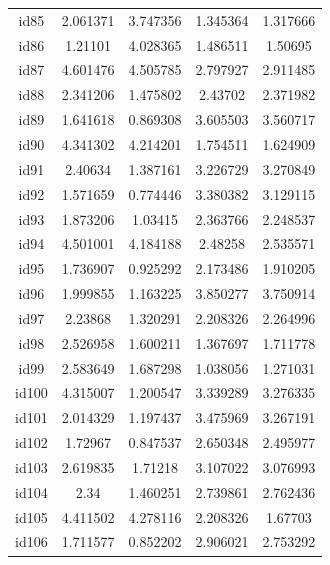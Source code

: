 \documentclass[num-refs]{wiley-article}
\begin{document}
\begin{center}
\begin{longtable}{ccccc}
id85      & 2.061371  & 3.747356       & 1.345364          & 1.317666          \\
id86      & 1.21101   & 4.028365       & 1.486511          & 1.50695           \\
id87      & 4.601476  & 4.505785       & 2.797927          & 2.911485          \\
id88      & 2.341206  & 1.475802       & 2.43702           & 2.371982          \\
id89      & 1.641618  & 0.869308       & 3.605503          & 3.560717          \\
id90      & 4.341302  & 4.214201       & 1.754511          & 1.624909          \\
id91      & 2.40634   & 1.387161       & 3.226729          & 3.270849          \\
id92      & 1.571659  & 0.774446       & 3.380382          & 3.129115          \\
id93      & 1.873206  & 1.03415        & 2.363766          & 2.248537          \\
id94      & 4.501001  & 4.184188       & 2.48258           & 2.535571          \\
id95      & 1.736907  & 0.925292       & 2.173486          & 1.910205          \\
id96      & 1.999855  & 1.163225       & 3.850277          & 3.750914          \\
id97      & 2.23868   & 1.320291       & 2.208326          & 2.264996          \\
id98      & 2.526958  & 1.600211       & 1.367697          & 1.711778          \\
id99      & 2.583649  & 1.687298       & 1.038056          & 1.271031          \\
id100     & 4.315007  & 1.200547       & 3.339289          & 3.276335          \\
id101     & 2.014329  & 1.197437       & 3.475969          & 3.267191          \\
id102     & 1.72967   & 0.847537       & 2.650348          & 2.495977          \\
id103     & 2.619835  & 1.71218        & 3.107022          & 3.076993          \\
id104     & 2.34      & 1.460251       & 2.739861          & 2.762436          \\
id105     & 4.411502  & 4.278116       & 2.208326          & 1.67703           \\
id106     & 1.711577  & 0.852202       & 2.906021          & 2.753292          \\

\end{longtable}
\end{center}
\end{document}
